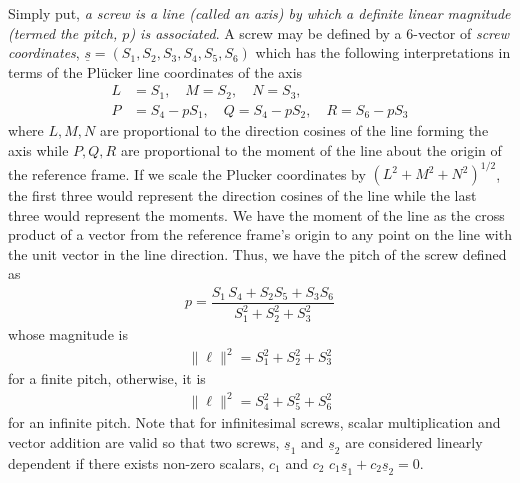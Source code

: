 Simply put, \textit{a screw is a line (called an axis) by which a definite linear magnitude (termed the pitch, $p$) is associated}.
A screw may be defined by a 6-vector of \textit{screw coordinates}, $\underline{s}=(S_1, S_2, S_3,S_4, S_5, S_6)$ which has the following interpretations in terms of the Pl\"ucker line coordinates of the axis
%
\begin{subequations}
	\begin{align}
	L &= S_1, \quad M = S_2, \quad N=S_3,   \label{eq:plucker_line} \\ 
	P &= S_4 - pS_1, \quad Q = S_4 - pS_2, \quad R = S_6 - pS_3
	\label{eq:plucker_mom}
	\end{align}
\end{subequations}
%
where $L, M, N$ are proportional to the direction cosines of the line forming the axis while $P, Q, R$ are proportional to the moment of the line about the origin of the reference frame. If we scale the Plucker coordinates by $(L^2 + M^2 + N^2)^{1/2}$, the first three would represent the direction cosines of the line while the last three would represent the moments. We have the moment of the line as the cross product of a vector from the reference frame's origin to any point on the line with the unit vector in the line direction. Thus, we have the pitch of the screw defined as 
%
\begin{align}
	p = \dfrac{S_1\,S_4+S_2S_5+S_3S_6}{S_1^2+S_2^2+S_3^2}
\end{align}
%
whose magnitude is 
%
\begin{align}
	\|\ell \|^2 = S_1^2+S_2^2+S_3^2
\end{align}
%
for a finite pitch, otherwise, it is
%
\begin{align}
\|\ell \|^2 = S_4^2+S_5^2+S_6^2
\end{align}
%
for an infinite pitch. Note that  for infinitesimal screws, scalar multiplication and vector addition are valid so that two screws, $\underline{s}_1$ and $\underline{s}_2$ are considered linearly dependent if there exists non-zero scalars, $c_1$ and $c_2$ \ie $c_1\underline{s}_1+c_2\underline{s}_2=0$.


